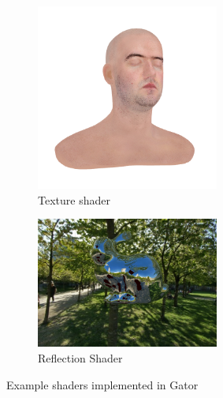 {\begin{figure}
	\centering
\begin{subfigure}[A]{.45\linewidth}
    \includegraphics[width=60mm]{fig/texture.png}
    \caption{Texture shader}
\end{subfigure}
\begin{subfigure}[B]{.45\linewidth}
	\includegraphics[width=60mm]{fig/reflection.png}
	\caption{Reflection Shader}
\end{subfigure}
\caption{Example shaders implemented in Gator}
\label{fig:shaders-1}
\end{figure}
	
}
